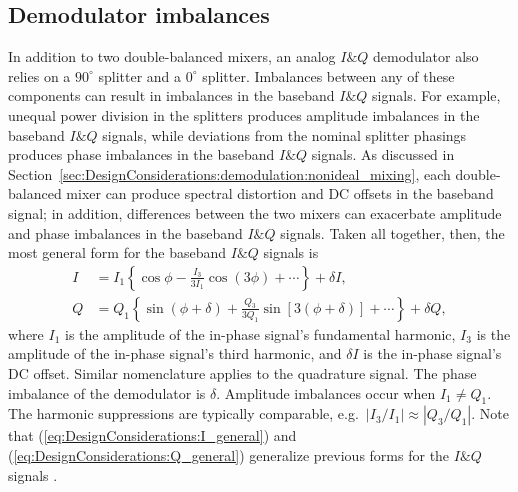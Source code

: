 \subsection{Demodulator imbalances}
\label{sec:DesignConsiderations:demodulation:demodulator_imbalances}
In addition to two double-balanced mixers,
an analog $I\&Q$ demodulator also relies on
a $90^{\circ}$ splitter and a $0^{\circ}$ splitter.
Imbalances between any of these components
can result in imbalances in the baseband $I\&Q$ signals.
For example, unequal power division in the splitters
produces amplitude imbalances in the baseband $I\&Q$ signals, while
deviations from the nominal splitter phasings
produces phase imbalances in the baseband $I\&Q$ signals.
As discussed in
Section~\ref{sec:DesignConsiderations:demodulation:nonideal_mixing},
each double-balanced mixer can produce
spectral distortion and DC offsets in the baseband signal;
in addition, differences between the two mixers
can exacerbate amplitude and phase imbalances
in the baseband $I\&Q$ signals.
Taken all together, then,
the most general form for the baseband $I\&Q$ signals is
\begin{align}
  I
  &=
  I_1 \left\{%
    \cos\phi
    -
    \frac{I_3}{3 I_1}
    \cos \left( 3 \phi \right)
    +
    \cdots
  \right\}
  +
  \delta I,
  \label{eq:DesignConsiderations:I_general}
  \\
  Q
  &=
  Q_1 \left\{%
    \sin \left( \phi + \delta \right)
    +
    \frac{Q_3}{3 Q_1}
    \sin \left[ 3 \left( \phi + \delta \right) \right]
    +
    \cdots
  \right\}
  +
  \delta Q,
  \label{eq:DesignConsiderations:Q_general}
\end{align}
where
$I_1$ is the amplitude of the in-phase signal's fundamental harmonic,
$I_3$ is the amplitude of the in-phase signal's third harmonic, and
$\delta I$ is the in-phase signal's DC offset.
Similar nomenclature applies to the quadrature signal.
The phase imbalance of the demodulator is $\delta$.
Amplitude imbalances occur when $I_1 \neq Q_1$.
The harmonic suppressions are typically comparable,
e.g.\ $|I_3 / I_1| \approx |Q_3 / Q_1|$.
Note that (\ref{eq:DesignConsiderations:I_general}) and
(\ref{eq:DesignConsiderations:Q_general})
generalize previous forms for the $I\&Q$ signals
\cite{vanzeeland_rsi04}.


